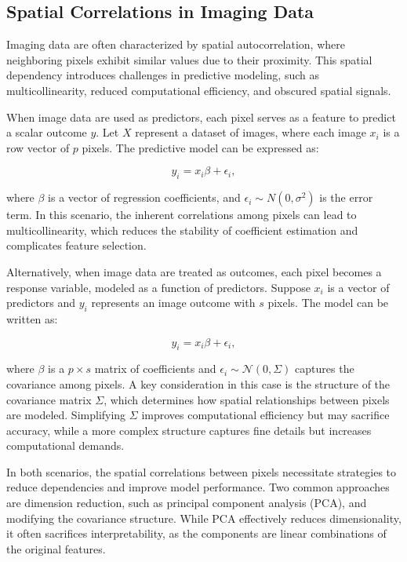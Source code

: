 \documentclass[12pt]{article}
\begin{document}
\subsection{Spatial Correlations in Imaging Data}

Imaging data are often characterized by spatial autocorrelation, where neighboring pixels exhibit similar values due to their proximity. This spatial dependency introduces challenges in predictive modeling, such as multicollinearity, reduced computational efficiency, and obscured spatial signals.

When image data are used as predictors, each pixel serves as a feature to predict a scalar outcome \( y \). Let \( X \) represent a dataset of images, where each image \( x_i \) is a row vector of \( p \) pixels. The predictive model can be expressed as:

\[
  y_i = x_i \beta + \epsilon_i,
\]

where \( \beta \) is a vector of regression coefficients, and \( \epsilon_i \sim N (0, \sigma^2) \) is the error term. In this scenario, the inherent correlations among pixels can lead to multicollinearity, which reduces the stability of coefficient estimation and complicates feature selection.

Alternatively, when image data are treated as outcomes, each pixel becomes a response variable, modeled as a function of predictors. Suppose \( x_i \) is a vector of predictors and \( y_i \) represents an image outcome with \( s \) pixels. The model can be written as:

\[
y_i = x_i \beta + \epsilon_i,
\]

where \( \beta \) is a \( p \times s \) matrix of coefficients and \( \epsilon_i \sim \mathcal{N}(0, \Sigma) \) captures the covariance among pixels. A key consideration in this case is the structure of the covariance matrix \( \Sigma \), which determines how spatial relationships between pixels are modeled. Simplifying \( \Sigma \) improves computational efficiency but may sacrifice accuracy, while a more complex structure captures fine details but increases computational demands.

In both scenarios, the spatial correlations between pixels necessitate strategies to reduce dependencies and improve model performance. Two common approaches are dimension reduction, such as principal component analysis (PCA), and modifying the covariance structure. While PCA effectively reduces dimensionality, it often sacrifices interpretability, as the components are linear combinations of the original features.
\end{document}
